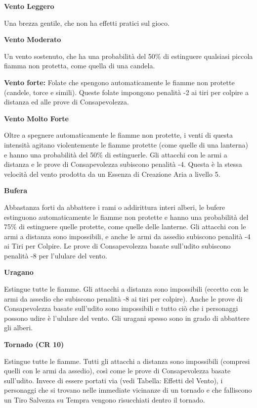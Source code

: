 \documentclass[a4paper,11pt,twoside,openany]{book}
\begin{document}
{\bigskip

\textbf{Vento Leggero}

Una brezza gentile, che non ha effetti pratici sul gioco.

\textbf{Vento Moderato}

Un vento sostenuto, che ha una probabilità del 50\% di estinguere qualsiasi piccola fiamma non protetta, come quella di una candela.

\textbf{Vento forte:} Folate che spengono automaticamente le fiamme non protette (candele, torce e simili). Queste folate impongono penalità -2 ai tiri per colpire a distanza ed alle prove di Consapevolezza.

\textbf{Vento Molto Forte}

Oltre a spegnere automaticamente le fiamme non protette, i venti di questa intensità agitano violentemente le fiamme protette (come quelle di una lanterna) e hanno una probabilità del 50\% di estinguerle. Gli attacchi con le armi a distanza e le prove di Consapevolezza subiscono penalità -4. Questa è la stessa velocità del vento prodotta da un Essenza di Creazione Aria a livello 5.

\textbf{Bufera}

Abbastanza forti da abbattere i rami o addirittura interi alberi, le bufere estinguono automaticamente le fiamme non protette e hanno una probabilità del 75\% di estinguere quelle protette, come quelle delle lanterne. Gli attacchi con le armi a distanza sono impossibili, e anche le armi da assedio subiscono penalità -4 ai Tiri per Colpire. Le prove di Consapevolezza basate sull'udito subiscono penalità -8 per l'ululare del vento.

\textbf{Uragano}

Estingue tutte le fiamme. Gli attacchi a distanza sono impossibili (eccetto con le armi da assedio che subiscono penalità -8 ai tiri per colpire). Anche le prove di Consapevolezza basate sull'udito sono impossibili e tutto ciò che i personaggi possono udire è l'ululare del vento. Gli uragani spesso sono in grado di abbattere gli alberi.

\textbf{Tornado (CR 10)}

Estingue tutte le fiamme. Tutti gli attacchi a distanza sono impossibili (compresi quelli con le armi da assedio), così come le prove di Consapevolezza basate sull'udito. Invece di essere portati via (vedi Tabella: Effetti del Vento), i personaggi che si trovano nelle immediate vicinanze di un tornado e che falliscono un Tiro Salvezza su Tempra vengono risucchiati dentro il tornado.

}
\end{document}
